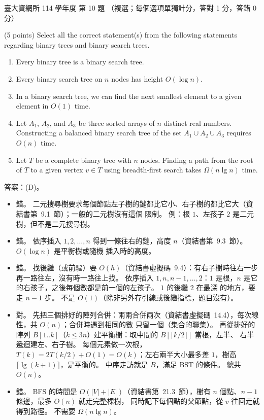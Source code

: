 \begin{pastexam}[label={px:ntu-114-dsa-10}]{臺大資網所 114 學年度 第 10 題}
（複選；每個選項單獨計分，答對 1 分，答錯 0 分）

(5 points) Select all the correct statement(s) from the following statements regarding binary trees and binary
search trees.
\begin{enumerate}[label=(\Alph*)]
\item Every binary tree is a binary search tree.
\item Every binary search tree on $n$ nodes has height $O(\log n)$.
\item In a binary search tree, we can find the next smallest element to a given element in $O(1)$ time.
\item Let $A_1$, $A_2$, and $A_3$ be three sorted arrays of $n$ distinct real numbers. Constructing a balanced
binary search tree of the set $A_1\cup A_2\cup A_3$ requires $O(n)$ time.
\item Let $T$ be a complete binary tree with $n$ nodes. Finding a path from the root of $T$ to a given vertex
$v\in T$ using breadth-first search takes $\Omega(n\lg n)$ time.
\end{enumerate}
\end{pastexam}

\begin{pastsoln}
答案：(D)。

\begin{itemize}
\item[(A)] 錯。 二元搜尋樹要求每個節點左子樹的鍵都比它小、右子樹的都比它大（資結書第~9.1~節）；一般的二元樹沒有這個
限制。 例：根 $1$、左孩子 $2$ 是二元樹，但不是二元搜尋樹。
\item[(B)] 錯。 依序插入 $1, 2, \ldots, n$ 得到一條往右的鏈，高度 $n$（資結書第~9.3~節）。 $O(\log n)$ 是平衡樹或隨機
插入時的高度。
\item[(C)] 錯。 找後繼（或前驅）要 $O(h)$（資結書虛擬碼~9.4）：有右子樹時往右一步再一路往左，沒有時一路往上找。
依序插入 $1, n, n - 1, \ldots, 2$：$1$ 是根，$n$ 是它的右孩子，之後每個數都是前一個的左孩子。 $1$ 的後繼 $2$ 在最深
的地方，要走 $n - 1$ 步。 不是 $O(1)$（除非另外存引線或後繼指標，題目沒有）。
\item[(D)] 對。 先把三個排好的陣列合併：兩兩合併兩次（資結書虛擬碼~14.4），每次線性，共 $O(n)$；合併時遇到相同的數
只留一個（集合的聯集）。 再從排好的陣列 $B[1..k]$（$k \le 3n$）建平衡樹：取中間的 $B[\lceil k/2 \rceil]$ 當根，左半、
右半遞迴建左、右子樹。 每個元素做一次根，$T(k) = 2T(k/2) + O(1) = O(k)$；左右兩半大小最多差 $1$，樹高
$\lceil \lg(k+1) \rceil$，是平衡的。 中序走訪就是 $B$，滿足 BST 的條件。 總共 $O(n)$。
\item[(E)] 錯。 BFS 的時間是 $O(|V| + |E|)$（資結書第~21.3~節），樹有 $n$ 個點、$n - 1$ 條邊，最多 $O(n)$ 就走完整棵樹，
同時記下每個點的父節點，從 $v$ 往回走就得到路徑。 不需要 $\Omega(n \lg n)$。
\end{itemize}
\end{pastsoln}
